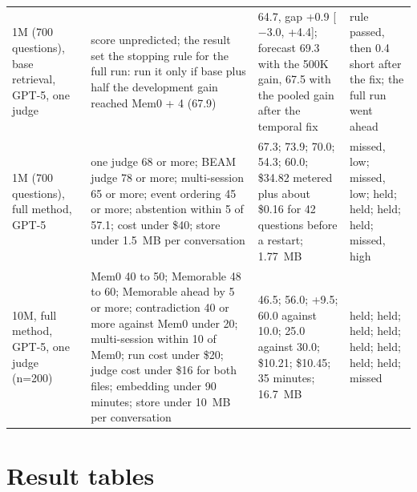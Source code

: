 {\begin{longtable}{@{}L{40mm}L{56mm}L{30mm}L{24mm}@{}}
1M (700 questions), base retrieval, GPT-5, one judge & score unpredicted; the result set the stopping rule for the full run: run it only if base plus half the development gain reached Mem0 + 4 (67.9) & 64.7, gap +0.9 [$-$3.0, +4.4]; forecast 69.3 with the 500K gain, 67.5 with the pooled gain after the temporal fix & rule passed, then 0.4 short after the fix; the full run went ahead \\
1M (700 questions), full method, GPT-5 & one judge 68 or more; BEAM judge 78 or more; multi-session 65 or more; event ordering 45 or more; abstention within 5 of 57.1; cost under \$40; store under 1.5~MB per conversation & 67.3; 73.9; 70.0; 54.3; 60.0; \$34.82 metered plus about \$0.16 for 42 questions before a restart; 1.77~MB & missed, low; missed, low; held; held; held; held; missed, high \\
10M, full method, GPT-5, one judge (n=200) & Mem0 40 to 50; Memorable 48 to 60; Memorable ahead by 5 or more; contradiction 40 or more against Mem0 under 20; multi-session within 10 of Mem0; run cost under \$20; judge cost under \$16 for both files; embedding under 90 minutes; store under 10~MB per conversation & 46.5; 56.0; +9.5; 60.0 against 10.0; 25.0 against 30.0; \$10.21; \$10.45; 35 minutes; 16.7~MB & held; held; held; held; held; held; held; held; missed \\
\end{longtable}}

\section{Result tables}
\label{app:tables}

